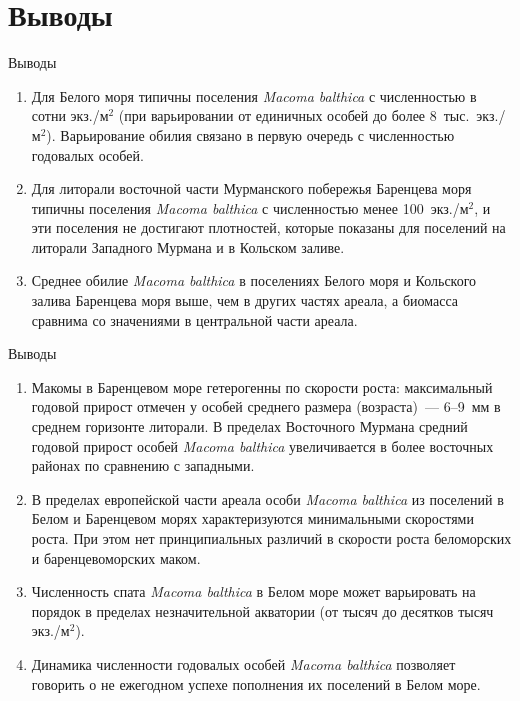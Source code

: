 \documentclass{beamer}
\begin{document}
		\section{Выводы}
\begin{small}

\begin{frame}{Выводы}
\addtocounter{enumi}{0}
	\begin{enumerate}
		\item Для Белого моря типичны поселения {\it Macoma balthica} с численностью в сотни экз./м$^2$ (при варьировании от единичных особей до более $8$~тыс.~экз./м$^2$). Варьирование обилия связано в первую очередь с численностью годовалых особей.
		\item Для литорали восточной части Мурманского побережья Баренцева моря типичны поселения {\it Macoma balthica} с численностью  менее 100~экз./м$^2$, и эти поселения не достигают плотностей, которые показаны для поселений на литорали Западного Мурмана и в Кольском заливе.
		\item Среднее обилие {\it Macoma balthica} в поселениях Белого моря и Кольского залива Баренцева моря выше, чем в других частях ареала, а биомасса сравнима со значениями в центральной части ареала. 
	\end{enumerate}
\end{frame}


\begin{frame}{Выводы}
	\begin{enumerate}
\addtocounter{enumi}{3}
		\item Макомы в Баренцевом море гетерогенны по скорости роста: максимальный годовой прирост отмечен у особей среднего размера (возраста)~--- 6--9~мм в среднем горизонте литорали. В пределах Восточного Мурмана средний годовой прирост особей {\it Macoma balthica} увеличивается в более восточных районах по сравнению с западными.
		\item В пределах европейской части ареала особи {\it Macoma balthica} из поселений в Белом и Баренцевом морях характеризуются минимальными скоростями роста. При этом нет принципиальных различий в скорости роста беломорских и баренцевоморских маком.
		\item Численность спата {\it Macoma balthica} в Белом море может варьировать на порядок в пределах незначительной акватории (от тысяч до десятков тысяч экз./м$^2$).
		\item Динамика численности годовалых особей {\it Macoma balthica} позволяет говорить о не ежегодном успехе пополнения их поселений в Белом море.
	\end{enumerate}
\end{frame}


\end{small}
\end{document}
